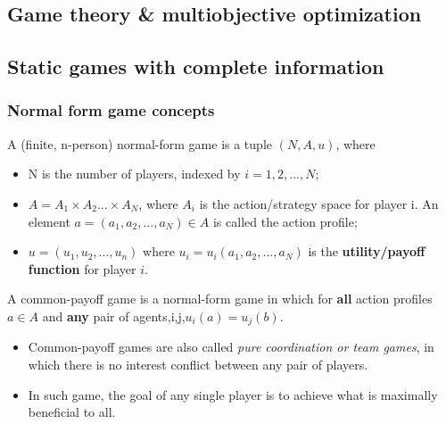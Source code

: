
\begin{refsection}
\startcontents[chapters]	
\chapter{Game theory \& multiobjective optimization}\label{ch:game-theory}	
\section{Static games with complete information}
\subsection{Normal form game concepts}
\begin{definition}  
\cite[3]{leyton2008essentials}A (finite, n-person) normal-form game is a tuple $(N,A,u)$, where
\begin{itemize}
    \item N is the number of players, indexed by $i=1,2,...,N$;
    \item $A=A_1\times A_2 ...\times A_N$, where $A_i$ is the action/strategy space for player i. An element $a = (a_1,a_2,...,a_N) \in A$ is called the action profile;
    \item $u=(u_1,u_2,...,u_n)$ where $u_i = u_i(a_1,a_2,...,a_N)$ is the \textbf{utility/payoff function} for player $i$. 
\end{itemize}
\end{definition}

\begin{definition}
\cite[4]{leyton2008essentials}A common-payoff game is a normal-form game in which for \textbf{all} action profiles $a\in A$ and \textbf{any} pair of agents,i,j,$u_i(a) = u_j(b)$.
\end{definition}

\begin{remark}\hfill
\begin{itemize}
    \item Common-payoff games are also called \emph{pure coordination or team games}, in which there is no interest conflict between any pair of players.  
    \item In such game, the goal of any single player is to achieve what is maximally beneficial to all.
\end{itemize}
\end{remark}



\end{refsection}
